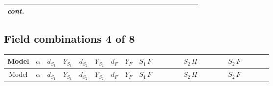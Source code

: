 \documentclass[8pt]{article}
\begin{document}
\begin{landscape}
\begin{longtable}{@{}cccccccc >{\raggedright\arraybackslash}p{0.21\linewidth} >{\raggedright\arraybackslash}p{0.21\linewidth} >{\raggedright\arraybackslash}p{0.21\linewidth}@{}}
\textit{cont.} &  &  &  &  &  &  &  &  &  & \scriptsize\adjustbox{max width=\linewidth}{$\begin{gathered} -\frac{2 \hbar  \overline{y_{2,i_1,r_1}} S_{1,j_3} S_{2,j_4} y_{2,i_1,r_1} S_{1,j_1}{}^{\dagger } S_{2,j_2}{}^{\dagger } \mathcal{I}_{12,j_3,j_1,j_4,j_2}{}^3 \lambda_{12}^{(1)}^{(3)}}{\sqrt{3} \epsilon } \\ -\frac{\hbar  \overline{y_{2,i_1,r_1}} S_{1,j_3} S_{2,j_4} y_{2,i_1,r_1} S_{1,j_1}{}^{\dagger } S_{2,j_2}{}^{\dagger } \mathcal{I}_{12,j_3,j_1,j_4,j_2}{}^3 \lambda_{12}^{(1)}^{(3)}}{\sqrt{3}}\end{gathered}$} \\
\midrule
\bottomrule
\end{longtable}
\clearpage
\subsection*{Field combinations 4 of 8}
\begin{longtable}{@{}cccccccc >{\raggedright\arraybackslash}p{0.21\linewidth} >{\raggedright\arraybackslash}p{0.21\linewidth} >{\raggedright\arraybackslash}p{0.21\linewidth}@{}}
\toprule
Model & $\alpha$ & $d_{S_1}$ & $Y_{S_1}$ & $d_{S_2}$ & $Y_{S_2}$ & $d_F$ & $Y_F$ & $S_1\,F$ & $S_2\,H$ & $S_2\,F$ \\
\midrule
\endfirsthead
\toprule
Model & $\alpha$ & $d_{S_1}$ & $Y_{S_1}$ & $d_{S_2}$ & $Y_{S_2}$ & $d_F$ & $Y_F$ & $S_1\,F$ & $S_2\,H$ & $S_2\,F$ \\
\midrule
\endhead

\end{longtable}
\end{landscape}
\end{document}
